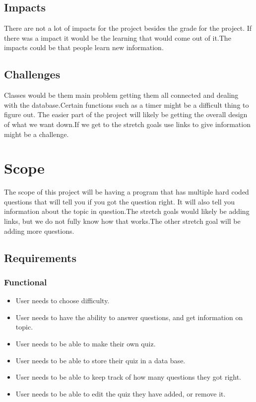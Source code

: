 \documentclass[10pt,conference,onecolumn,compsoc]{IEEEtran}
\begin{document}
\subsection{Impacts}
There are not a lot of impacts for the project besides the grade for the project. 
If there was a impact it would be the learning that would come out of it.The impacts could be that people learn new information. 



\subsection{Challenges}
Classes would be them main problem getting them all connected and dealing with the database.Certain functions such as a timer might be a difficult thing to figure out.
The easier part of the project will likely be getting the overall design of what 
we want down.If we get to the stretch goals  use links to give information  might be a challenge.

\section{Scope}
The scope of this project will be having a program that has multiple hard coded questions 
that will tell you if you got the question right. It will also tell you information about the topic in question.The stretch goals would likely be adding links, but we do not fully know how that works.The other stretch goal will be adding more questions.




\subsection{Requirements}

\subsubsection{Functional}
\begin{itemize}
\item User needs to choose difficulty.
\item User needs to have the ability to answer  questions, and get information on topic.
\item User needs to be able to make their own quiz.
\item User needs to be able to store their quiz in a data base.
\item User needs to be able to keep track of how many questions they got right.
\item User needs to be able to edit the quiz they have added, or remove it.
\end{itemize}
\end{document}
